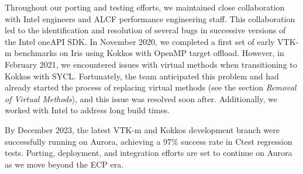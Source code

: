Throughout our porting and testing efforts, we maintained close collaboration with Intel engineers and ALCF performance engineering staff. This collaboration led to the identification and resolution of several bugs in successive versions of the Intel oneAPI SDK. In November 2020, we completed a first set of early VTK-m benchmarks on Iris using Kokkos with OpenMP target offload. However, in February 2021, we encountered issues with virtual methods when transitioning to Kokkos with SYCL. Fortunately, the team anticipated this problem and had already started the process of replacing virtual methods (see the section {\it Removal of Virtual Methods}), and this issue was resolved soon after. Additionally, we worked with Intel to address long build times.

By December 2023, the latest VTK-m and Kokkos development branch were successfully running on Aurora, achieving a 97\% success rate in Ctest regression tests. Porting, deployment, and integration efforts are set to continue on Aurora as we move beyond the ECP era.
